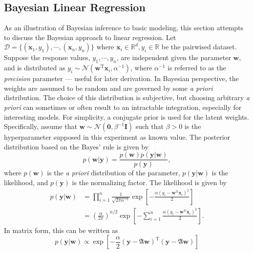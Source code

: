 \subsection{Bayesian Linear Regression}\label{sec:blr}
As an illustration of Bayesian inference to basic modeling, this section attempts to discuss the Bayesian approach to linear regression. Let ${\mathscr{D}=\{(\mathbf{x}_1,y_1),\cdots, (\mathbf{x}_n,y_n)\}}$ where $\mathbf{x}_i\in\mathbb{R}^{d}, y_i\in \mathbb{R}$ be the pairwised dataset. Suppose the response values, $y_1,\cdots,y_n$, are independent given the parameter $\mathbf{w}$, and is distributed as $y_i\sim\mathcal{N}(\mathbf{w}^{\text{T}}\mathbf{x}_i,\alpha^{-1})$, where $\alpha^{-1}$ is referred to as the \textit{precision} parameter --- useful for later derivation. In Bayesian perspective, the weights are assumed to be random and are governed by some \textit{a priori} distribution. The choice of this distribution is subjective, but choosing arbitrary \textit{a priori} can sometimes or often result to an intractable integration, especially for interesting models. For simplicity, a conjugate prior is used for the latent weights. Specifically, assume that ${\mathbf{w}\sim\mathcal{N}(\mathbf{0},\beta^{-1}\mathbf{I})}$ such that $\beta>0$ is the hyperparameter supposed in this experiment as known value. The posterior distribution based on the Bayes' rule is given by
\begin{equation}\label{eq:bayesrulepost}
	p(\mathbf{w}|\mathbf{y})=\frac{p(\mathbf{w})p(\mathbf{y}|\mathbf{w})}{p(\mathbf{y})},
\end{equation}
where $p(\mathbf{w})$ is the \textit{a priori} distribution of the parameter, $p(\mathbf{y}|\mathbf{w})$ is the likelihood, and $p(\mathbf{y})$ is the normalizing factor. The likelihood is given by
\begin{align}
    p(\mathbf{y}|\mathbf{w})&=\prod_{i=1}^{n}\frac{1}{\sqrt{2\pi\alpha^{-1}}}\exp\left[-\frac{\alpha(y_i-\mathbf{w}^{\text{T}}\mathbf{x}_i)^2}{2}\right]\\
    &=\left(\frac{\alpha}{2\pi}\right)^{n/2}\exp\left[-\sum_{i=1}^n\frac{\alpha(y_i-\mathbf{w}^{\text{T}}\mathbf{x}_i)^2}{2}\right].\label{eq:likelihood:blreg}
\end{align}
In matrix form, this can be written as
\begin{equation}
    p(\mathbf{y}|\mathbf{w})\propto\exp\left[-\frac{\alpha}{2}(\mathbf{y}-\boldsymbol{\mathfrak{A}}\mathbf{w})^{\text{T}}(\mathbf{y}-\boldsymbol{\mathfrak{A}}\mathbf{w})\right]
\end{equation}
